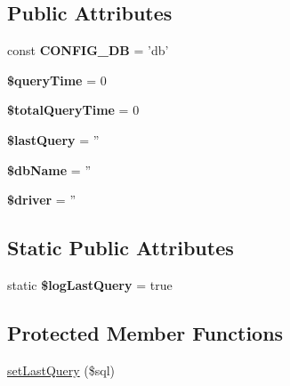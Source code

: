 \subsection*{Public Attributes}
\begin{DoxyCompactItemize}
\item 
\hypertarget{classTk_1_1Db_1_1Pdo_a000369404980c583e85fac00585e1277}{const {\bfseries C\+O\+N\+F\+I\+G\+\_\+\+D\+B} = 'db'}\label{classTk_1_1Db_1_1Pdo_a000369404980c583e85fac00585e1277}

\item 
\hypertarget{classTk_1_1Db_1_1Pdo_af39c89614771ed9be46c9058b10d1748}{{\bfseries \$query\+Time} = 0}\label{classTk_1_1Db_1_1Pdo_af39c89614771ed9be46c9058b10d1748}

\item 
\hypertarget{classTk_1_1Db_1_1Pdo_a2e0fca39c9e269b59f4e1920bbb1d2e6}{{\bfseries \$total\+Query\+Time} = 0}\label{classTk_1_1Db_1_1Pdo_a2e0fca39c9e269b59f4e1920bbb1d2e6}

\item 
\hypertarget{classTk_1_1Db_1_1Pdo_a530faad2e1d0ee67e0600ec2b89dde4e}{{\bfseries \$last\+Query} = ''}\label{classTk_1_1Db_1_1Pdo_a530faad2e1d0ee67e0600ec2b89dde4e}

\item 
\hypertarget{classTk_1_1Db_1_1Pdo_af3ae39cba12a7483da926cd3662e06dc}{{\bfseries \$db\+Name} = ''}\label{classTk_1_1Db_1_1Pdo_af3ae39cba12a7483da926cd3662e06dc}

\item 
\hypertarget{classTk_1_1Db_1_1Pdo_ac30711ea8f3d8026072e89c9d042cf5f}{{\bfseries \$driver} = ''}\label{classTk_1_1Db_1_1Pdo_ac30711ea8f3d8026072e89c9d042cf5f}

\end{DoxyCompactItemize}
\subsection*{Static Public Attributes}
\begin{DoxyCompactItemize}
\item 
\hypertarget{classTk_1_1Db_1_1Pdo_ac5b5458fd8305ed7f5a1a0dd5e19a6a6}{static {\bfseries \$log\+Last\+Query} = true}\label{classTk_1_1Db_1_1Pdo_ac5b5458fd8305ed7f5a1a0dd5e19a6a6}

\end{DoxyCompactItemize}
\subsection*{Protected Member Functions}
\begin{DoxyCompactItemize}
\item 
\hyperlink{classTk_1_1Db_1_1Pdo_a06996da86aa4aaaaa09548c75b8b02fc}{set\+Last\+Query} (\$sql)
\end{DoxyCompactItemize}
